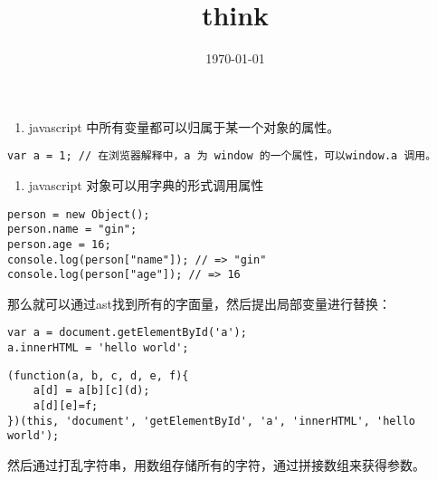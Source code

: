 \documentclass[11pt]{article}
\date{\today}
\title{think}
\begin{document}
\maketitle
\tableofcontents

\begin{enumerate}
\item javascript 中所有变量都可以归属于某一个对象的属性。
\end{enumerate}
\begin{verbatim}
var a = 1; // 在浏览器解释中，a 为 window 的一个属性，可以window.a 调用。
\end{verbatim}
\begin{enumerate}
\item javascript 对象可以用字典的形式调用属性
\end{enumerate}
\begin{verbatim}
person = new Object();
person.name = "gin";
person.age = 16;
console.log(person["name"]); // => "gin"
console.log(person["age"]); // => 16
\end{verbatim}

那么就可以通过ast找到所有的字面量，然后提出局部变量进行替换：
\begin{verbatim}
var a = document.getElementById('a');
a.innerHTML = 'hello world';
\end{verbatim}

\begin{verbatim}
(function(a, b, c, d, e, f){
    a[d] = a[b][c](d);
    a[d][e]=f;
})(this, 'document', 'getElementById', 'a', 'innerHTML', 'hello world');
\end{verbatim}

然后通过打乱字符串，用数组存储所有的字符，通过拼接数组来获得参数。
\end{document}
